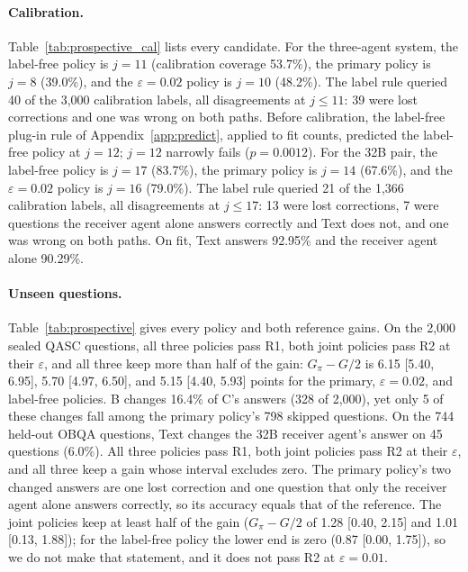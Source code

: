 \paragraph{Calibration.} Table~\ref{tab:prospective_cal} lists every candidate. For the three-agent system, the label-free policy is $j=11$ (calibration coverage 53.7\%), the primary policy is $j=8$ (39.0\%), and the $\varepsilon=0.02$ policy is $j=10$ (48.2\%). The label rule queried 40 of the 3,000 calibration labels, all disagreements at $j\le11$: 39 were lost corrections and one was wrong on both paths. Before calibration, the label-free plug-in rule of Appendix~\ref{app:predict}, applied to fit counts, predicted the label-free policy at $j=12$; $j=12$ narrowly fails ($p=0.0012$). For the 32B pair, the label-free policy is $j=17$ (83.7\%), the primary policy is $j=14$ (67.6\%), and the $\varepsilon=0.02$ policy is $j=16$ (79.0\%). The label rule queried 21 of the 1,366 calibration labels, all disagreements at $j\le17$: 13 were lost corrections, 7 were questions the receiver agent alone answers correctly and Text does not, and one was wrong on both paths. On fit, Text answers 92.95\% and the receiver agent alone 90.29\%.

\paragraph{Unseen questions.} Table~\ref{tab:prospective} gives every policy and both reference gains. On the 2,000 sealed QASC questions, all three policies pass R1, both joint policies pass R2 at their $\varepsilon$, and all three keep more than half of the gain: $G_\pi-G/2$ is 6.15 [5.40, 6.95], 5.70 [4.97, 6.50], and 5.15 [4.40, 5.93] points for the primary, $\varepsilon=0.02$, and label-free policies. B changes 16.4\% of C's answers (328 of 2,000), yet only 5 of these changes fall among the primary policy's 798 skipped questions. On the 744 held-out OBQA questions, Text changes the 32B receiver agent's answer on 45 questions (6.0\%). All three policies pass R1, both joint policies pass R2 at their $\varepsilon$, and all three keep a gain whose interval excludes zero. The primary policy's two changed answers are one lost correction and one question that only the receiver agent alone answers correctly, so its accuracy equals that of the reference. The joint policies keep at least half of the gain ($G_\pi-G/2$ of 1.28 [0.40, 2.15] and 1.01 [0.13, 1.88]); for the label-free policy the lower end is zero (0.87 [0.00, 1.75]), so we do not make that statement, and it does not pass R2 at $\varepsilon=0.01$.

